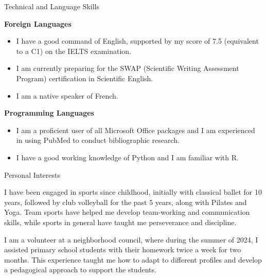\documentclass[
	10pt,
]{style} %
\begin{document}
\begin{rSection}{Technical and Language Skills}

	\textbf{Foreign Languages}
	\begin{itemize}[noitemsep, topsep=0pt, left=0pt]
		\item I have a good command of English, supported by my score of 7.5 (equivalent to a C1) on the IELTS examination.
		\item I am currently preparing for the SWAP (Scientific Writing Assessment Program) certification in Scientific English.
		\item I am a native speaker of French.
	\end{itemize}
	\textbf{Programming Languages}
	\begin{itemize}[noitemsep, topsep=0pt, left=0pt]
		\item I am a proficient user of all Microsoft Office packages and I am experienced in using PubMed to conduct bibliographic research.
		\item I have a good working knowledge of Python and I am familiar with R.
	\end{itemize}

\end{rSection}



\begin{rSection}{Personal Interests}
	\vspace{-1em}
	\begin{rSubsection}{}{}{}{}
		\item I have been engaged in sports since childhood, initially with classical ballet for 10 years, followed by club volleyball for the past 5 years, along with Pilates and Yoga. Team sports have helped me develop team-working and communication skills, while sports in general have taught me perseverance and discipline.
		\item I am a volunteer at a neighborhood council, where during the summer of 2024, I assisted primary school students with their homework twice a week for two months. This experience taught me how to adapt to different profiles and develop a pedagogical approach to support the students.
	\end{rSubsection}

\end{rSection}
\end{document}
